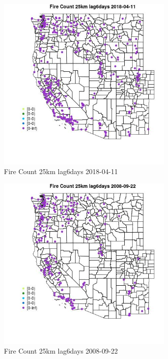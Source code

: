 \begin{figure} 
\centering  
\includegraphics[width=0.77\textwidth]{Code_Outputs/Report_ML_input_PM25_Step4_part_e_de_duplicated_aves_compiled_2019-05-18wNAs_MapObsFire_Count_25km_lag6days2018-04-11.jpg} 
\caption{\label{fig:Report_ML_input_PM25_Step4_part_e_de_duplicated_aves_compiled_2019-05-18wNAsMapObsFire_Count_25km_lag6days2018-04-11}Fire Count 25km lag6days 2018-04-11} 
\end{figure} 
 

\begin{figure} 
\centering  
\includegraphics[width=0.77\textwidth]{Code_Outputs/Report_ML_input_PM25_Step4_part_e_de_duplicated_aves_compiled_2019-05-18wNAs_MapObsFire_Count_25km_lag6days2008-09-22.jpg} 
\caption{\label{fig:Report_ML_input_PM25_Step4_part_e_de_duplicated_aves_compiled_2019-05-18wNAsMapObsFire_Count_25km_lag6days2008-09-22}Fire Count 25km lag6days 2008-09-22} 
\end{figure} 
 


